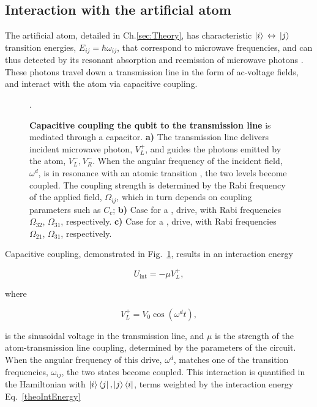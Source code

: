  
 \subsection{Interaction with the artificial atom\label{sec:Interactions}}
 The artificial atom, detailed in Ch.\ref{sec:Theory}, has characteristic $ \Ket{i} \,\leftrightarrow\, \Ket{j}$ transition energies, $ E_{ij} = \hbar\omega_{ij} $, that correspond to microwave frequencies, and can thus detected by its resonant absorption and reemission of microwave photons \cite{astafiev_ResonanceSingleAtom,UltimateOnChipQuantumAmplifier,ElectromagneticallyInducedTransparency}. These photons travel down a transmission line in the form of ac-voltage fields, and interact with the atom via capacitive coupling.
 
 \begin{figure}
 	\caption{\small \textbf{Capacitive coupling the qubit to the transmission line} is mediated through a capacitor. \textbf{a)} The transmission line delivers incident microwave photon, $ V_{L}^{+} $, and guides the photons emitted by the atom, $ V_{L}^{-}, V_{R}^{-} $. When the angular frequency of the incident field, $ \omega^{d} $, is in resonance with an atomic transition \lra{}, the two levels become coupled. The coupling strength is determined by the Rabi frequency of the applied field, $ \Omega_{ij} $, which in turn depends on coupling parameters such as $ C_c $; \textbf{b)} Case for a \lra{}, \lra{} drive, with Rabi frequencies $ \Omega_{32} $, $ \Omega_{31}  $, respectively. \textbf{c)} Case for a \lra{}, \lra{} drive, with Rabi frequencies $ \Omega_{21} $, $ \Omega_{31}  $, respectively.}
 	\label{fig:transmissionLine}.
 \end{figure}

  Capacitive coupling, demonstrated in Fig.~\ref{fig:transmissionLine}, results in an interaction energy \cite{ioChunHoi,thesisQuantumInformationProcessing} 
  
  \begin{equation}
	  {U}_{\text{int}} = - \mu V_{L}^{+},
	  \label{theoIntEnergy}
  \end{equation}
  
  \noindent where
  
  \begin{equation}\label{theoField}
	  V_{L}^{+}=V_0\cos(\omega^{d} t),
  \end{equation} 
  
  \noindent is the sinusoidal voltage in the transmission line, and $ \mu $ is the strength of the atom-transmission line coupling, determined by the parameters of the circuit. When the angular frequency of this drive, $ \omega^{d} $, matches one of the \lra{} transition frequencies, $\omega_{ij} $, the two states become coupled. This interaction is quantified in the Hamiltonian with $ \ket{i}\bra{j}, \ket{j}\bra{i} $, terms weighted by the interaction energy Eq.~\eqref{theoIntEnergy}
  
